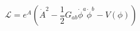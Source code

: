 \begin{equation} \mathcal{L}= e^A \left(\dot{A}^2-\frac{1}{2} G_{ab}\dot{\phi}^a \dot{\phi}^b -V(\phi) \right)\end{equation}

